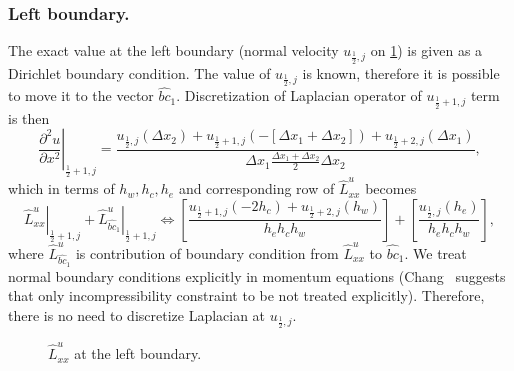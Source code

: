 \documentclass{article}
\numberwithin{equation}{section}
\begin{document}
\subsubsection{Left boundary.}\label{sec:laplacian-left}
The exact value at the left boundary (normal velocity $u_{\frac{1}{2},j}$ on \cref{fig:luxx-left}) is given as a Dirichlet boundary condition. The value of $u_{\frac{1}{2},j}$ is known, therefore it is possible to move it to the vector $\hat{bc}_1$. Discretization of Laplacian operator of $u_{\frac{1}{2}+1,j}$ term is then
\begin{equation}\label{eqn:laplacian-discretization-u-left-deltax}
\left.\frac{\partial^2 u}{\partial x^2}\right|_{\frac{1}{2}+1,j}=
\frac{
	u_{\frac{1}{2},j}\left(\Delta x_2\right)
	+u_{\frac{1}{2}+1,j}\left(-[\Delta x_1 + \Delta x_2]\right)
	+u_{\frac{1}{2}+2,j}\left(\Delta x_1\right)}
	{\Delta x_1 \frac{\Delta x_1+\Delta x_2}{2} \Delta x_2}
	,
\end{equation}
which in terms of $h_w,h_c,h_e$ and corresponding row of $\hat{L}_{xx}^u$ becomes
\begin{equation}\label{eqn:laplacian-discretization-u-left}
\left.\hat{L}_{xx}^u\right|_{\frac{1}{2}+1,j}+\left.\hat{L}^u_{\hat{bc}_1}\right|_{\frac{1}{2}+1,j}\iff
	\left[\frac{
		u_{\frac{1}{2}+1,j}\left(-2h_c\right)
		+u_{\frac{1}{2}+2,j}\left(h_w\right)
	}
	{h_e h_c h_w}\right]
	+\left[\frac{u_{\frac{1}{2},j}\left(h_e\right)}{h_e h_c h_w}\right],
\end{equation}
where $\hat{L}^u_{\hat{bc}_1}$ is contribution of boundary condition from $\hat{L}^u_{xx}$ to $\hat{bc}_1$. We treat normal boundary conditions explicitly in momentum equations (Chang~\cite{Chang:2002} suggests that only incompressibility constraint to be not treated explicitly). Therefore, there is no need to discretize Laplacian at $u_{\frac{1}{2},j}$. 

\begin{figure}[H] %
  \caption{$\hat{L}^u_{xx}$ at the left boundary.}\label{fig:luxx-left}
\end{figure}
\end{document}
